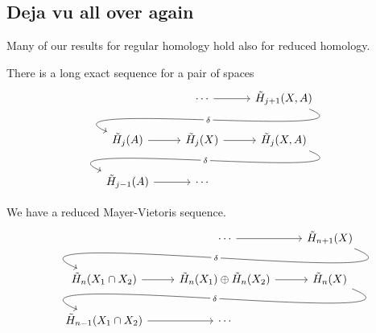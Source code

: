 \documentclass[main.tex]{subfiles}
\begin{document}
\subsection{Deja vu all over again}
\label{ssc:deja_vu_all_over_again}

Many of our results for regular homology hold also for reduced homology.

\begin{proposition}
  There is a long exact sequence for a pair of spaces
  \begin{equation*}
    \begin{tikzcd}
      & \cdots
      \arrow[r]
      & \tilde{H}_{j+1}(X, A)
      \\
      \tilde{H}_{j}(A)
      \arrow[from=urr, out=-22, in=157, looseness=1, overlay, "\delta" description]
      \arrow[r,]
      & \tilde{H}_{j}(X)
      \arrow[r,]
      & \tilde{H}_{j}(X, A)
      \\
      \tilde{H}_{j-1}(A)
      \arrow[r]
      \arrow[from=urr, out=-22, in=157, looseness=1, overlay, "\delta" description]
      & \cdots
    \end{tikzcd}
  \end{equation*}
\end{proposition}

\begin{proposition}
  \label{prop:reduced_mayer_vietoris}
  We have a reduced Mayer-Vietoris sequence.
  \begin{equation*}
    \begin{tikzcd}
      & \cdots
      \arrow[r]
      & \tilde{H}_{n+1}(X)
      \\
      \tilde{H}_{n}(X_{1} \cap X_{2})
      \arrow[from=urr, out=-22, in=157, looseness=1, overlay, "\delta" description]
      \arrow[r]
      & \tilde{H}_{n}(X_{1}) \oplus \tilde{H}_{n}(X_{2})
      \arrow[r]
      & \tilde{H}_{n}(X)
      \\
      \tilde{H}_{n-1}(X_{1} \cap X_{2})
      \arrow[r]
      \arrow[from=urr, out=-22, in=157, looseness=1, overlay, "\delta" description]
      & \cdots
    \end{tikzcd}
  \end{equation*}
\end{proposition}
\end{document}
